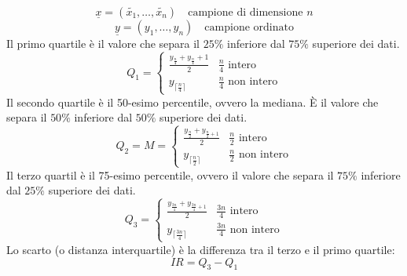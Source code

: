 \documentclass[a4paper]{article}
\theoremstyle{break}
\theoremstyle{break}
\theoremstyle{break}
\theoremstyle{break}
\begin{document}
\begin{itemize}
\begin{figure}[H]
\begin{tikzpicture}
		      \end{tikzpicture}
	      \end{figure}
	      \[
		      \underline{x} = (\tilde{x_1}, \ldots, \tilde{x_n}) \quad \text{campione di dimensione } n
	      \]
	      \[
		      \underline{y} = (y_1, \ldots, y_n) \quad \text{campione ordinato}
	      \]
	      Il primo quartile è il valore che separa il \( 25\% \) inferiore dal \( 75\% \) superiore
	      dei dati.
	      \[
		      Q_1 = \begin{cases}
			      \frac{y_\frac{n}{4} + y_\frac{n}{4}+1}{2} & \frac{n}{4} \text{  intero}    \\
			      y_{\lceil \frac{n}{4} \rceil}             & \frac{n}{4} \text{ non intero}
		      \end{cases}
	      \]
	      Il secondo quartile è il 50-esimo percentile, ovvero la mediana. È il valore che separa
	      il \( 50\% \) inferiore dal \( 50\% \) superiore dei dati.
	      \[
		      Q_2 = M = \begin{cases}
			      \frac{y_{\frac{n}{2}} + y_{\frac{n}{2}+1}}{2} & \frac{n}{2} \text{  intero}    \\
			      y_{\lceil \frac{n}{2} \rceil}                 & \frac{n}{2} \text{ non intero}
		      \end{cases}
	      \]
	      Il terzo quartil è il 75-esimo percentile, ovvero il valore che separa il \( 75\% \)
	      inferiore dal \( 25\% \) superiore dei dati.
	      \[
		      Q_3 = \begin{cases}
			      \frac{y_{\frac{3n}{4}} + y_{\frac{3n}{4}+1}}{2} & \frac{3n}{4} \text{  intero}    \\
			      y_{\lceil \frac{3n}{4} \rceil}                  & \frac{3n}{4} \text{ non intero}
		      \end{cases}
	      \]
	      Lo scarto (o distanza interquartile) è la differenza tra il terzo e il primo quartile:
	      \[
		      IR = Q_3 - Q_1
	      \]
\end{itemize}
\end{document}
